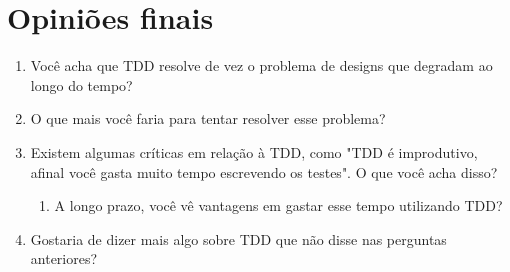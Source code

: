 \section{Opiniões finais}

\begin{enumerate}
	\item Você acha que TDD resolve de vez o problema de designs que degradam ao longo do tempo?
	\item O que mais você faria para tentar resolver esse problema?
	\item Existem algumas críticas em relação à TDD, como "TDD é improdutivo, afinal você gasta muito tempo escrevendo os testes". O que você acha disso?
		\begin{enumerate}
			\item A longo prazo, você vê vantagens em gastar esse tempo utilizando TDD?
		\end{enumerate}
	\item Gostaria de dizer mais algo sobre TDD que não disse nas perguntas anteriores?
\end{enumerate}